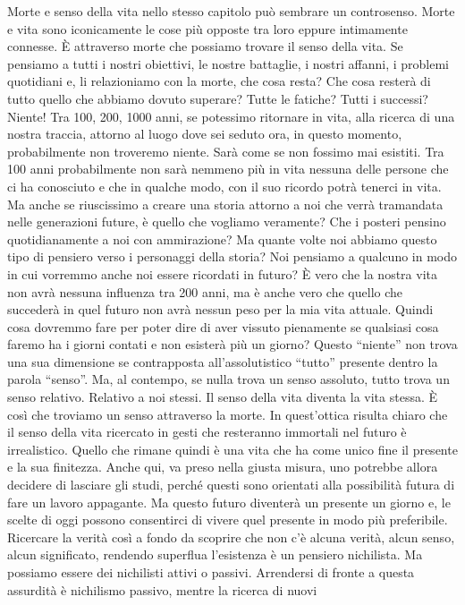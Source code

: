 \documentclass[12pt]{book} %
\begin{document}
Morte e senso della vita nello stesso capitolo può sembrare un controsenso. Morte e vita sono iconicamente le cose più
opposte tra loro eppure intimamente connesse. È attraverso morte che possiamo trovare il senso della vita. Se pensiamo
a tutti i nostri obiettivi, le nostre battaglie, i nostri affanni, i problemi quotidiani e, li relazioniamo con la
morte, che cosa resta? Che cosa resterà di tutto quello che abbiamo dovuto superare? Tutte le fatiche? Tutti i
successi? Niente! Tra 100, 200, 1000 anni, se potessimo ritornare in vita, alla ricerca di una nostra traccia, attorno
al luogo dove sei seduto ora, in questo momento, probabilmente non troveremo niente. Sarà come se non fossimo mai
esistiti. 
Tra 100 anni probabilmente non sarà nemmeno più in vita nessuna delle persone che ci ha
conosciuto e che in qualche modo, con il suo ricordo potrà tenerci in vita. Ma anche se riuscissimo a creare una storia
attorno a noi che verrà tramandata nelle generazioni future, è quello che vogliamo veramente? Che i posteri pensino
quotidianamente a noi con ammirazione? Ma quante volte noi abbiamo questo tipo di pensiero verso i personaggi della
storia? Noi pensiamo a qualcuno in modo in cui vorremmo anche noi essere ricordati in futuro? È vero che la nostra vita
non avrà nessuna influenza tra 200 anni, ma è anche vero che quello che succederà in quel futuro non avrà nessun peso
per la mia vita attuale. Quindi cosa dovremmo fare per poter dire di aver vissuto pienamente se qualsiasi cosa faremo
ha i giorni contati e non esisterà più un giorno? Questo “niente” non trova una sua dimensione se contrapposta
all'assolutistico “tutto” presente dentro la parola “senso”. Ma, al contempo, se nulla trova un
senso assoluto, tutto trova un senso relativo. Relativo a noi stessi. Il senso della vita diventa la vita stessa. 
È così che troviamo un senso attraverso la morte. In quest'ottica risulta chiaro che il senso della
vita ricercato in gesti che resteranno immortali nel futuro è irrealistico. Quello che rimane quindi è una vita che ha
come unico fine il presente e la sua finitezza. Anche qui, va preso nella giusta misura, uno potrebbe allora decidere
di lasciare gli studi, perché questi sono orientati alla possibilità futura di fare un lavoro appagante. Ma questo
futuro diventerà un presente un giorno e, le scelte di oggi possono consentirci di vivere quel presente in modo più
preferibile. Ricercare la verità così a fondo da scoprire che non c'è alcuna verità, alcun senso, alcun
significato, rendendo superflua l'esistenza è un pensiero nichilista. Ma possiamo essere dei
nichilisti attivi o passivi. Arrendersi di fronte a questa assurdità è nichilismo passivo, mentre la ricerca di nuovi
\end{document}
